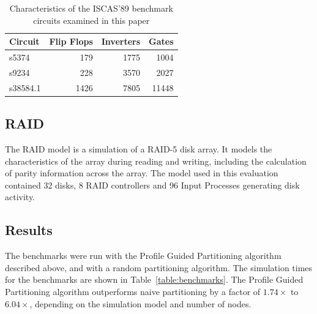 \documentclass{wscpaperproc}
\begin{document}
\begin{table}[h]
\centering
\begin{tabular}{@{}lrrr@{}}
\toprule
Circuit  & Flip Flops & Inverters & Gates \\ \midrule
s5374    & 179        & 1775      & 1004  \\
s9234    & 228        & 3570      & 2027  \\
s38584.1 & 1426       & 7805      & 11448 \\ \bottomrule
\end{tabular}
\caption{Characteristics of the ISCAS'89 benchmark circuits examined in this paper}
\label{table:iscasStats}
\end{table}

\subsection{RAID}

The RAID model is a simulation of a RAID-5 disk array. It models the characteristics of the array during reading and writing, including the calculation of parity information across the array. The model used in this evaluation contained 32 disks, 8 RAID controllers and 96 Input Processes generating disk activity.

\subsection{Results}

The benchmarks were run with the Profile Guided Partitioning algorithm described above, and with a random partitioning algorithm. The simulation times for the benchmarks are shown in Table~\ref{table:benchmarks}. The Profile Guided Partitioning algorithm outperforms naive partitioning by a factor of \(1.74\times\) to \(6.04\times\), depending on the simulation model and number of nodes.
\end{document}
